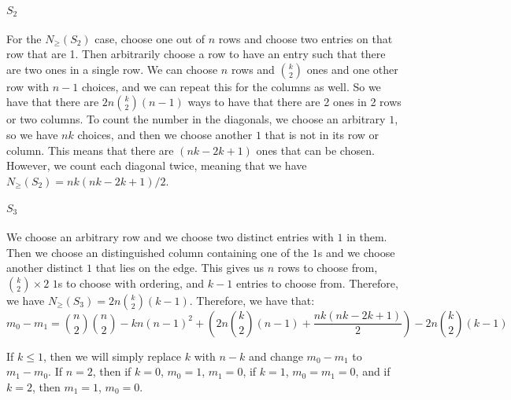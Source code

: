 \documentclass[]{article}
\begin{document}
\paragraph{$S_2$}
For the $N_{\geq}(S_2)$ case, choose one out of $n$ rows and choose two entries on that row that are 1. Then arbitrarily choose a row to have an entry such that there are two ones in a single row. We can choose $n$ rows and $\binom{k}{2}$ ones and one other row with $n-1$ choices, and we can repeat this for the columns as well. So we have that there are $2n \binom{k}{2}(n-1)$ ways to have that there are 2 ones in 2 rows or two columns. To count the number in the diagonals, we choose an arbitrary $1$, so we have $nk$ choices, and then we choose another $1$ that is not in its row or column. This means that there are $(nk - 2k + 1)$ ones that can be chosen. However, we count each diagonal twice, meaning that we have $N_{\geq}(S_2) = nk(nk - 2k + 1)/2$.
\paragraph{$S_3$}
We choose an arbitrary row and we choose two distinct entries with $1$ in them. Then we choose an distinguished column containing one of the $1$s and we choose another distinct $1$ that lies on the edge. This gives us $n$ rows to choose from, $\binom{k}{2} \times 2$ $1$s to choose with ordering, and $k-1$ entries to choose from. Therefore, we have $N_{\geq}(S_3) = 2 n \binom{k}{2} (k - 1)$. 
Therefore, we have that:
\begin{equation}
	m_0 - m_1 = \binom{n}{2}\binom{n}{2} - kn(n-1)^2 + (2n \binom{k}{2}(n-1) + \frac{nk(nk - 2k + 1)}{2}) - 2 n \binom{k}{2} (k - 1)
\end{equation}

If $k \leq 1$, then we will simply replace $k$ with $n - k$ and change $m_0 - m_1$ to $m_1 - m_0$. If $n = 2$, then if $k = 0$, $m_0 = 1$, $m_1 = 0$, if $k = 1$, $m_0 = m_1 = 0$, and if $k = 2$, then $m_1 = 1$, $m_0 = 0$.
\end{document}
